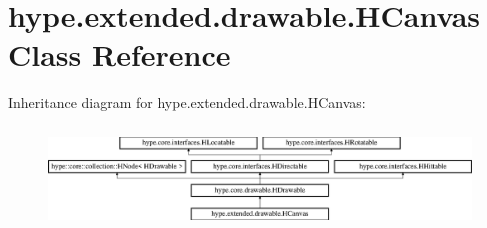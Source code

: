\hypertarget{classhype_1_1extended_1_1drawable_1_1_h_canvas}{\section{hype.\-extended.\-drawable.\-H\-Canvas Class Reference}
\label{classhype_1_1extended_1_1drawable_1_1_h_canvas}
}
Inheritance diagram for hype.\-extended.\-drawable.\-H\-Canvas\-:\begin{figure}[H]
\begin{center}
\leavevmode
\includegraphics[height=2.745098cm]{classhype_1_1extended_1_1drawable_1_1_h_canvas}
\end{center}
\end{figure}
